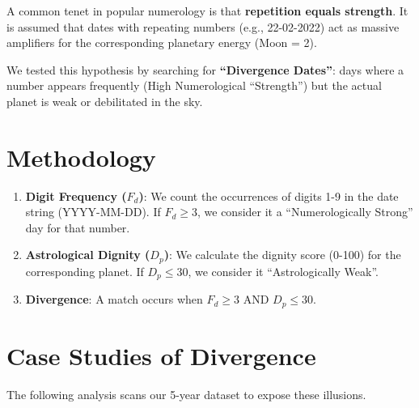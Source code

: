 \documentclass[
  11pt,
  a4paper,
  oneside,
  openany]{report}
\providecommand{\tightlist}{%
  \setlength{\itemsep}{0pt}\setlength{\parskip}{0pt}}\usepackage{longtable,booktabs,array}
\begin{document}
A common tenet in popular numerology is that \textbf{repetition equals
strength}. It is assumed that dates with repeating numbers (e.g.,
22-02-2022) act as massive amplifiers for the corresponding planetary
energy (Moon = 2).

We tested this hypothesis by searching for \textbf{``Divergence
Dates''}: days where a number appears frequently (High Numerological
``Strength'') but the actual planet is weak or debilitated in the sky.

\section{Methodology}\label{methodology-1}

\begin{enumerate}
\def\labelenumi{\arabic{enumi}.}
\tightlist
\item
  \textbf{Digit Frequency (\(F_d\))}: We count the occurrences of digits
  1-9 in the date string (YYYY-MM-DD). If \(F_d \ge 3\), we consider it
  a ``Numerologically Strong'' day for that number.
\item
  \textbf{Astrological Dignity (\(D_p\))}: We calculate the dignity
  score (0-100) for the corresponding planet. If \(D_p \le 30\), we
  consider it ``Astrologically Weak''.
\item
  \textbf{Divergence}: A match occurs when \(F_d \ge 3\) AND
  \(D_p \le 30\).
\end{enumerate}

\section{Case Studies of Divergence}\label{case-studies-of-divergence}

The following analysis scans our 5-year dataset to expose these
illusions.
\end{document}
